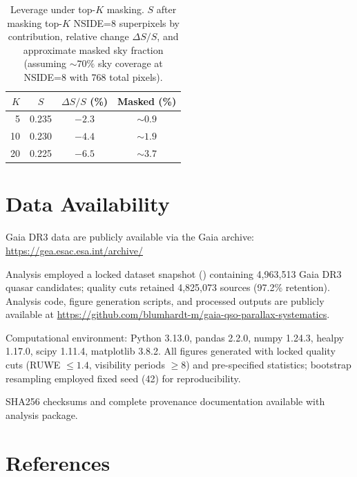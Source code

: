 \documentclass{aa}
\begin{document}
\begin{table}
\centering
\caption{Leverage under top-$K$ masking. $S$ after masking top-$K$ NSIDE=8 superpixels by contribution, relative change $\Delta S/S$, and approximate masked sky fraction (assuming ${\sim}70\%$ sky coverage at NSIDE=8 with 768 total pixels).}
\label{tab:leverage_masking}
\small
\begin{tabular}{@{}rccc@{}}
\toprule
$K$ & $S$ & $\Delta S/S$ (\%) & Masked (\%) \\
\midrule
5  & 0.235 & $-2.3$ & ${\sim}0.9$ \\
10 & 0.230 & $-4.4$ & ${\sim}1.9$ \\
20 & 0.225 & $-6.5$ & ${\sim}3.7$ \\
\bottomrule
\end{tabular}
\end{table}


% 
% 

\section*{Data Availability}

Gaia DR3 data are publicly available via the Gaia archive: \url{https://gea.esac.esa.int/archive/}

Analysis employed a locked dataset snapshot () containing 4,963,513 Gaia DR3 quasar candidates; quality cuts retained 4,825,073 sources (97.2\% retention). Analysis code, figure generation scripts, and processed outputs are publicly available at \url{https://github.com/blumhardt-m/gaia-qso-parallax-systematics}.

Computational environment: Python 3.13.0, pandas 2.2.0, numpy 1.24.3, healpy 1.17.0, scipy 1.11.4, matplotlib 3.8.2. All figures generated with locked quality cuts (RUWE $\leq 1.4$, visibility periods $\geq 8$) and pre-specified statistics; bootstrap resampling employed fixed seed (42) for reproducibility.

SHA256 checksums and complete provenance documentation available with analysis package.
\clearpage
\section*{References}
\end{document}
